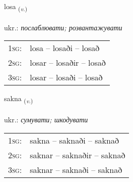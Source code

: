 \documentclass[frontgrid, backgrid]{flacards}\usepackage[]{graphicx}\usepackage[]{xcolor}
\begin{document}
\renewcommand{\flhead}{\vskip5pt \fboxsep=0pt {\small\bfseries\footnotesize Sagnorð | дієслово}}
\renewcommand{\fcfoot}{\vskip5pt \fboxsep=0pt \hspace{2pt}{\small\bfseries\footnotesize 2K}}

\renewcommand{\blhead}{\vskip5pt {\small\bfseries\footnotesize Sagnorð | дієслово }}
\renewcommand{\bcfoot}{\vskip5pt \hspace{2pt}{\small\bfseries\footnotesize 2K}}


{losa \small{\textsubscript{(\textit{v.})}} \\[1ex] %
\textphonetic{[lɔːsa]} \\
ukr.: \emph{послаблювати; розвантажувати} \\  [2ex]
\renewcommand*{\arraystretch}{0.8}
\begin{tabular}{p{1cm}l}
\textsc{1sg}: & losa -- losaði -- losað \\ 
\textsc{2sg}: & losar -- losaðir -- losað \\ 
\textsc{3sg}: & losar -- losaði -- losað \\ 
\end{tabular}
}

\renewcommand{\flhead}{\vskip5pt \fboxsep=0pt {\small\bfseries\footnotesize Sagnorð | дієслово}}
\renewcommand{\fcfoot}{\vskip5pt \fboxsep=0pt \hspace{2pt}{\small\bfseries\footnotesize 2K}}

\renewcommand{\blhead}{\vskip5pt {\small\bfseries\footnotesize Sagnorð | дієслово }}
\renewcommand{\bcfoot}{\vskip5pt \hspace{2pt}{\small\bfseries\footnotesize 2K}}


{sakna \small{\textsubscript{(\textit{v.})}} \\[1ex] %
\textphonetic{[sahkna]} \\
ukr.: \emph{сумувати; шкодувати} \\  [2ex]
\renewcommand*{\arraystretch}{0.8}
\begin{tabular}{p{1cm}l}
\textsc{1sg}: & sakna -- saknaði -- saknað \\ 
\textsc{2sg}: & saknar -- saknaðir -- saknað \\ 
\textsc{3sg}: & saknar -- saknaði -- saknað \\ 
\end{tabular}
}
\end{document}
